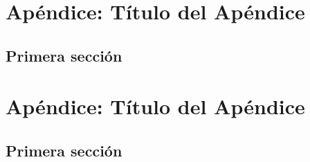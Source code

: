 \documentclass[12pt,a4paper,]{book}
\def\ifdoblecara{} %
\def\ifprincipal{} %
\numberwithin{dummy}{section}
\theoremstyle{ocrenumbox}
\theoremstyle{blacknumex}
\theoremstyle{blacknumbox}
\theoremstyle{ocrenum}
\theoremstyle{ocrenum}
\begin{document}
\fi

\ifdefined\ifdoblecara
\fancyhead{}{}
\fancyhead[LE,RO]{\scriptsize\rightmark}
\fancyfoot[LO,RE]{\scriptsize\slshape \leftmark}
\fancyfoot[C]{}
\fancyfoot[LE,RO]{\footnotesize\thepage}
\else
\fancyhead{}{}
\fancyhead[RO]{\scriptsize\rightmark}
\fancyfoot[LO]{\scriptsize\slshape \leftmark}
\fancyfoot[C]{}
\fancyfoot[RO]{\footnotesize\thepage}
\fi

\renewcommand{\headrulewidth}{0.4pt}
\renewcommand{\footrulewidth}{0.4pt}

\hypertarget{apuxe9ndice-tuxedtulo-del-apuxe9ndice}{%
\chapter{Apéndice: Título del
Apéndice}\label{apuxe9ndice-tuxedtulo-del-apuxe9ndice}}

\hypertarget{primera-secciuxf3n}{%
\section{Primera sección}\label{primera-secciuxf3n}}

\ifdefined\ifprincipal
\else
\setlength{\parindent}{1em}
\pagestyle{fancy}
\setcounter{tocdepth}{4}
\tableofcontents

\fi

\ifdefined\ifdoblecara
\fancyhead{}{}
\fancyhead[LE,RO]{\scriptsize\rightmark}
\fancyfoot[LO,RE]{\scriptsize\slshape \leftmark}
\fancyfoot[C]{}
\fancyfoot[LE,RO]{\footnotesize\thepage}
\else
\fancyhead{}{}
\fancyhead[RO]{\scriptsize\rightmark}
\fancyfoot[LO]{\scriptsize\slshape \leftmark}
\fancyfoot[C]{}
\fancyfoot[RO]{\footnotesize\thepage}
\fi

\renewcommand{\headrulewidth}{0.4pt}
\renewcommand{\footrulewidth}{0.4pt}

\hypertarget{apuxe9ndice-tuxedtulo-del-apuxe9ndice-1}{%
\chapter{Apéndice: Título del
Apéndice}\label{apuxe9ndice-tuxedtulo-del-apuxe9ndice-1}}

\hypertarget{primera-secciuxf3n-1}{%
\section{Primera sección}\label{primera-secciuxf3n-1}}

\FloatBarrier
\cleardoublepage

\ifdefined\ifdoblecara
  \fancyhead[LE,RO]{}
  \fancyfoot[LO,RE]{}
\else
  \fancyhead[RO]{}
  \fancyfoot[LO]{}
\fi
\end{document}

